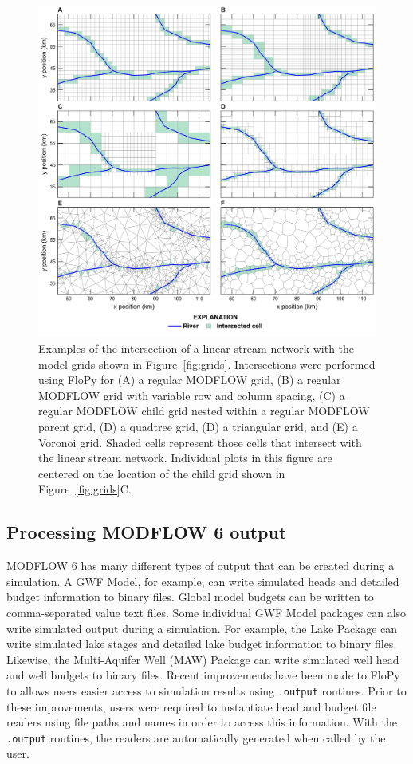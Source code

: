 \documentclass[11pt, oneside]{article}   	%
\begin{document}
\begin{figure}[ht!]
	\begin{center}
		\includegraphics{figures/grids_intersection.png}
	\end{center}
	\caption{Examples of the intersection of a linear stream network with the model grids shown in Figure~\ref{fig:grids}.  Intersections were performed using FloPy for (A) a regular MODFLOW grid, (B) a regular MODFLOW grid with variable row and column spacing, (C) a regular MODFLOW child grid nested within a regular MODFLOW parent grid, (D) a quadtree grid, (D) a triangular grid, and (E) a Voronoi grid.  Shaded cells represent those cells that intersect with the linear stream network.  Individual plots in this figure are centered on the location of the child grid shown in Figure~\ref{fig:grids}C.}
	\label{fig:intersections}
\end{figure}

\subsection{Processing MODFLOW 6 output}

MODFLOW 6 has many different types of output that can be created during a simulation.  A GWF Model, for example, can write simulated heads and detailed budget information to binary files.  Global model budgets can be written to comma-separated value text files.  Some individual GWF Model packages can also write simulated output during a simulation.  For example, the Lake Package can write simulated lake stages and detailed lake budget information to binary files.  Likewise, the Multi-Aquifer Well (MAW) Package can write simulated well head and well budgets to binary files.  Recent improvements have been made to FloPy to allows users easier access to simulation results using \texttt{.output} routines.  Prior to these improvements, users were required to instantiate head and budget file readers using file paths and names in order to access this information.  With the \texttt{.output} routines, the readers are automatically generated when called by the user.
\end{document}
